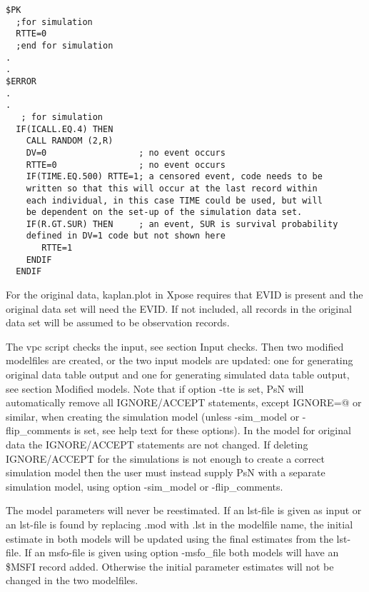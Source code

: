 \begin{verbatim}
$PK
  ;for simulation
  RTTE=0
  ;end for simulation
.
.
$ERROR
.
.
   ; for simulation 
  IF(ICALL.EQ.4) THEN
    CALL RANDOM (2,R)
    DV=0                  ;	no event occurs
    RTTE=0                ;	no event occurs 
    IF(TIME.EQ.500) RTTE=1; a censored event, code needs to be
    written so that this will occur at the last record within 
    each individual, in this case TIME could be used, but will 
    be dependent on the set-up of the simulation data set.
    IF(R.GT.SUR) THEN     ; an event, SUR is survival probability 
    defined in DV=1	code but not shown here
       RTTE=1
    ENDIF
  ENDIF
\end{verbatim}


For the original data, kaplan.plot in Xpose requires that EVID is present and the original data set will need the EVID. If not included, all records in the original data set will be assumed to be observation records.

The vpc script checks the input, see section Input checks. Then two modified modelfiles are created, or the two input models are updated: one for generating original data table output and one for generating simulated data table output, see section Modified models. Note that if option -tte is set, PsN will automatically remove all  IGNORE/ACCEPT statements, except IGNORE=@ or similar,  when creating the simulation model (unless -sim\_model or -flip\_comments is set, see help text for these options). In the model for original data the IGNORE/ACCEPT statements are not changed. If deleting IGNORE/ACCEPT for the simulations is not enough to create a correct simulation model then the user must instead supply PsN with a separate simulation model, using option -sim\_model or -flip\_comments.

The model parameters will never be reestimated. If an lst-file is given as input or an lst-file is found by replacing .mod with .lst in the modelfile name, the initial estimate in both models will be updated using the final estimates from the lst-file. If an msfo-file is given using option -msfo\_file both models will have an \$MSFI record added. Otherwise the initial parameter estimates will not be changed in the two modelfiles. 

